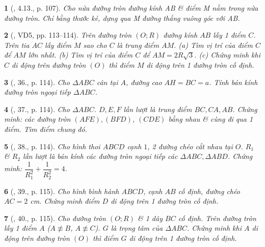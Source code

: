 \documentclass{article}
\newtheorem{baitoan}{}
\begin{document}
\begin{baitoan}[\cite{Binh_boi_duong_Toan_9_tap_1}, 4.13., p. 107]
	Cho nửa đường tròn đường kính AB \& điểm M nằm trong nửa đường tròn. Chỉ bằng thước kẻ, dựng qua M đường thẳng vuông góc với AB.
\end{baitoan}

\begin{baitoan}[\cite{Tuyen_Toan_9_old}, VD5, pp. 113--114]
	Trên đường tròn $(O;R)$ đường kính $AB$ lấy 1 điểm $C$. Trên tia $AC$ lấy điểm $M$ sao cho $C$ là trung điểm $AM$. (a) Tìm vị trí của điểm $C$ để $AM$ lớn nhất. (b) Tìm vị trí của điểm $C$ để $AM = 2R\sqrt{3}$. (c) Chứng minh khi $C$ di động trên đường tròn $(O)$ thì điểm $M$ di động trên 1 đường tròn cố định.
\end{baitoan}

\begin{baitoan}[\cite{Tuyen_Toan_9_old}, 36., p. 114]
	Cho $\Delta ABC$ cân tại $A$, đường cao $AH = BC = a$. Tính bán kính đường tròn ngoại tiếp $\Delta ABC$.
\end{baitoan}

\begin{baitoan}[\cite{Tuyen_Toan_9_old}, 37., p. 114]
	Cho $\Delta ABC$. $D,E,F$ lần lượt là trung điểm $BC,CA,AB$. Chứng minh: các đường tròn $(AFE),(BFD)$, $(CDE)$ bằng nhau \& cùng đi qua 1 điểm. Tìm điểm chung đó.
\end{baitoan}

\begin{baitoan}[\cite{Tuyen_Toan_9_old}, 38., p. 114]
	Cho hình thoi $ABCD$ cạnh $1$, 2 đường chéo cắt nhau tại $O$. $R_1$ \& $R_2$ lần lượt là bán kính các đường tròn ngoại tiếp các $\Delta ABC,\Delta ABD$. Chứng minh: $\dfrac{1}{R_1^2} + \dfrac{1}{R_2^2} = 4$.
\end{baitoan}

\begin{baitoan}[\cite{Tuyen_Toan_9_old}, 39., p. 115]
	Cho hình bình hành $ABCD$, cạnh $AB$ cố định, đường chéo $AC = 2$ \emph{cm}. Chứng minh điểm $D$ di động trên 1 đường tròn cố định.
\end{baitoan}

\begin{baitoan}[\cite{Tuyen_Toan_9_old}, 40., p. 115]
	Cho đường tròn $(O;R)$ \& 1 dây $BC$ cố định. Trên đường tròn lấy 1 điểm $A$ ($A\not\equiv B$, $A\not\equiv C$). $G$ là trọng tâm của $\Delta ABC$. Chứng minh khi $A$ di động trên đường tròn $(O)$ thì điểm $G$ di động trên 1 đường tròn cố định.
\end{baitoan}
\end{document}
